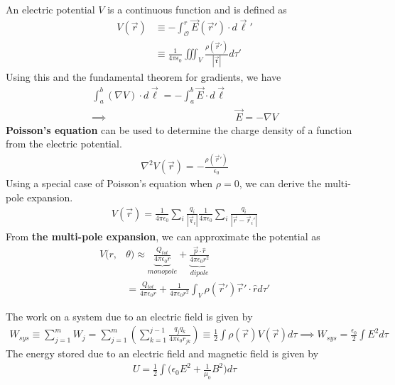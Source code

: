 \begin{multicols}{2}
\begin{align}
\end{align}
An electric potential $V$ is a continuous function and is defined as
\begin{align}
	V(\vec{r}) &\equiv -\int_{\mathcal{O}}^{r}\vec{E}(\vec{r}')\cdot d\vec{\ell}' \\ &\equiv \frac{1}{4\pi\epsilon_0}\iiint_V \frac{\rho(\vec{r}')}{|\vec{\mathfrak{r}}|}d\tau'
\end{align} 
Using this and the fundamental theorem for gradients, we have
\begin{align}
	\int_{a}^{b}(\nabla V)\cdot d\vec{\ell}=-\int_{a}^{b}\vec{E}\cdot d\vec{\ell} \\ \implies &\vec{E} = -\nabla V
\end{align} 
\textbf{Poisson's equation} can be used to determine the charge density of a function from the electric potential. 
\begin{align}
	\nabla^2 V(\vec{r}) = -\frac{\rho(\vec{r}')}{\epsilon_0}
\end{align} 
Using a special case of Poisson's equation when $\rho =0$, we can derive the multi-pole expansion.
\begin{align}
	V(\vec{r}) = \frac{1}{4\pi\epsilon_0}\sum_{i}\frac{q_i}{|\vec{\mathfrak{r}}_i|}\frac{1}{4\pi\epsilon_0}\sum_{i}\frac{q_i}{|\vec{r}-\vec{r}_i'|}
\end{align}
From \textbf{the multi-pole expansion}, we can approximate the potential as
\begin{align}
	V(r,&\theta) \approx \underbrace{\frac{Q_{tot}}{4\pi\epsilon_0 r}}_{monopole} + \underbrace{\frac{\vec{p} \cdot \hat{r}}{4\pi\epsilon_0 r^2}}_{dipole} \\ &= \frac{Q_{tot}}{4\pi\epsilon_0 r} + \frac{1}{4\pi\epsilon_0r^2}\int_V \rho(\vec{r}')\vec{r}'\cdot \hat{r} d\tau'
\end{align}
\end{multicols}
The work on a system due to an electric field is given by
\begin{align}
	W_{sys} \equiv \sum_{j=1}^{m} W_j= \sum_{j=1}^{m} \left(\sum_{k=1}^{j-1} \frac{q_jq_k}{4\pi\epsilon_0r_{jk}}\right) \equiv \frac{1}{2}\int \rho(\vec{r})V(\vec{r})d\tau \implies W_{sys}= \frac{\epsilon_0}{2}\int E^2 d\tau
\end{align}
The energy stored due to an electric field and magnetic field is given by
\begin{align}
	U= \frac{1}{2}\int \bigg(\epsilon_0E^2+\frac{1}{\mu_0}B^2\bigg) d\tau
\end{align}
